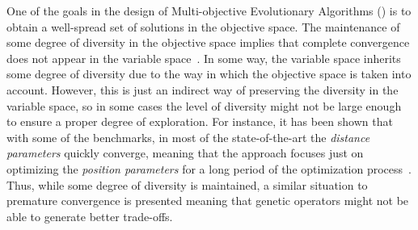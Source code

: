 One of the goals in the design of Multi-objective Evolutionary Algorithms (\MOEAS{}) is to obtain a well-spread 
set of solutions in the objective space.
%
The maintenance of some degree of diversity in the objective space implies that complete convergence 
does not appear in the variable space~\cite{Joel:GDE3_CEC09}.
%
In some way, the variable space inherits some degree of diversity due to the way in which the objective space is 
taken into account. 
%
However, this is just an indirect way of preserving the diversity in the variable space, so 
in some cases the level of diversity might not be large enough to ensure a proper degree of exploration.
%
For instance, it has been shown that with some of the \WFG{} benchmarks, in most of the state-of-the-art \MOEAS{} 
the \textit{distance parameters} quickly converge, meaning that the approach focuses just on optimizing the 
\textit{position parameters} for a long period of the optimization process~\cite{Joel:GDE3_CEC09}.
%
Thus, while some degree of diversity is maintained, a similar situation to premature convergence is presented
meaning that genetic operators might not be able to generate better trade-offs. 

